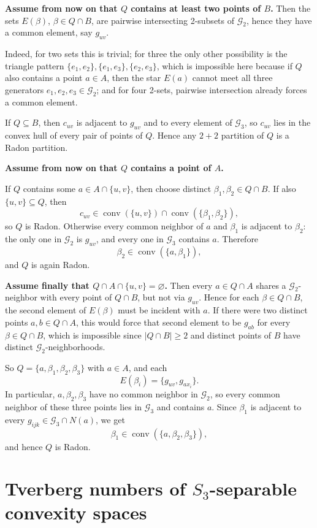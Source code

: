 \documentclass[11pt]{article}
\theoremstyle{definition}
\newcommand{\G}{\mathcal{G}}
\newcommand{\conv}{\operatorname{conv}}
\begin{document}
\textbf{Assume from now on that $Q$ contains at least two points of $B$.}
Then the sets $E(\beta)$, $\beta\in Q\cap B$, are pairwise intersecting 2-subsets of $\G_2$, hence they
have a common element, say $g_{uv}$. 

Indeed, for two sets this is trivial; for
three the only other possibility is the triangle pattern
$\{e_1,e_2\},\{e_1,e_3\},\{e_2,e_3\}$, which is impossible here because if
$Q$ also contains a point $a\in A$, then the star $E(a)$ cannot meet all three
generators $e_1,e_2,e_3 \in \G_2$; and for four 2-sets, pairwise
intersection already forces a common element.

If $Q\subseteq B$, then $c_{uv}$ is adjacent to $g_{uv}$ and to every element of $\G_3$, so
$c_{uv}$ lies in the convex hull of every pair of points of $Q$.
Hence any $2+2$ partition of $Q$ is a Radon partition.

\textbf{Assume from now on that $Q$ contains a point of $A$.}

If $Q$ contains some $a\in A\cap \{u,v\}$, then choose distinct $\beta_1,\beta_2\in Q\cap B$.
If also $\{u,v\}\subseteq Q$, then
\[
c_{uv}\in \conv(\{u,v\})\cap \conv(\{\beta_1,\beta_2\}),
\]
so $Q$ is Radon.
Otherwise every common neighbor of $a$ and $\beta_1$ is adjacent to $\beta_2$:
the only one in $\G_2$ is $g_{uv}$, and every one in $\G_3$ contains $a$.
Therefore
\[
\beta_2\in \conv(\{a,\beta_1\}),
\]
and $Q$ is again Radon.

\textbf{Assume finally that $Q\cap A\cap \{u,v\}=\varnothing$.}
Then every $a\in Q\cap A$ shares a $\G_2$-neighbor with every point of $Q\cap B$,
but not via $g_{uv}$.
Hence for each $\beta\in Q\cap B$, the second element of $E(\beta)$ must be incident with $a$.
If there were two distinct points $a,b\in Q\cap A$, this would force that second
element to be $g_{ab}$ for every $\beta\in Q\cap B$, which is impossible since $|Q\cap B|\ge 2$
and distinct points of $B$ have distinct $\G_2$-neighborhoods.

So $Q=\{a,\beta_1,\beta_2,\beta_3\}$ with $a\in A$, and each
\[
E(\beta_i)=\{g_{uv},g_{ax_i}\}.
\]
In particular, $a,\beta_2,\beta_3$ have no common neighbor in $\G_2$, so every common
neighbor of these three points lies in $\G_3$ and contains $a$.
Since $\beta_1$ is adjacent to every $g_{ijk} \in \G_3 \cap N(a)$, we get
\[
\beta_1\in \conv(\{a,\beta_2,\beta_3\}),
\]
and hence $Q$ is Radon.



\section{Tverberg numbers of $S_3$-separable convexity spaces}
\label{sec:separable}
\end{document}
